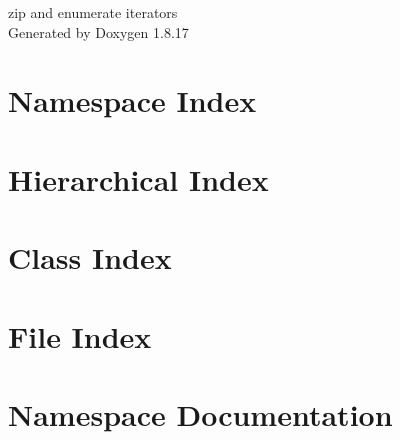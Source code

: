 \let\mypdfximage\pdfximage\def\pdfximage{\immediate\mypdfximage}\documentclass[twoside]{book}
\newcommand{\+}{\discretionary{\mbox{\scriptsize$\hookleftarrow$}}{}{}}
\newcommand{\clearemptydoublepage}{%
  \newpage{\pagestyle{empty}\cleardoublepage}%
}
\begin{document}
\hypersetup{pageanchor=false,
             bookmarksnumbered=true,
             pdfencoding=unicode
            }
\begin{titlepage}
\vspace*{7cm}
\begin{center}%
{\Large zip and enumerate iterators }\\
\vspace*{1cm}
{\large Generated by Doxygen 1.8.17}\\
\end{center}
\end{titlepage}
\clearemptydoublepage
{}
\tableofcontents
\clearemptydoublepage
{}
\hypersetup{pageanchor=true}

\chapter{Namespace Index}

\chapter{Hierarchical Index}

\chapter{Class Index}

\chapter{File Index}

\chapter{Namespace Documentation}



\end{document}
